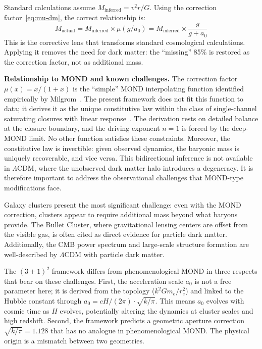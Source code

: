 \documentclass[aps,prd,preprint,superscriptaddress,showpacs,preprintnumbers,amsmath,amssymb,nofootinbib]{revtex4-2}
\begin{document}
Standard calculations assume $M_{\text{inferred}} = v^2 r / G$. Using the correction factor~\eqref{eq:mu-dm}, the correct relationship is:
\begin{equation}
M_{\text{actual}} = M_{\text{inferred}} \times \mu(g/a_0) = M_{\text{inferred}} \times \frac{g}{g + a_0}
\label{eq:corrective-lens}
\end{equation}
This is the corrective lens that transforms standard cosmological calculations. Applying it removes the need for dark matter: the ``missing'' 85\% is restored as the correction factor, not as additional mass.

\textbf{Relationship to MOND and known challenges.} The correction factor $\mu(x) = x/(1+x)$ is the ``simple'' MOND interpolating function identified empirically by Milgrom~\cite{milgrom1983}. The present framework does not fit this function to data; it derives it as the unique constitutive law within the class of single-channel saturating closures with linear response~\cite{paper1}. The derivation rests on detailed balance at the closure boundary, and the driving exponent $n = 1$ is forced by the deep-MOND limit. No other function satisfies these constraints. Moreover, the constitutive law is invertible: given observed dynamics, the baryonic mass is uniquely recoverable, and vice versa. This bidirectional inference is not available in $\Lambda$CDM, where the unobserved dark matter halo introduces a degeneracy. It is therefore important to address the observational challenges that MOND-type modifications face.

Galaxy clusters present the most significant challenge: even with the MOND correction, clusters appear to require additional mass beyond what baryons provide. The Bullet Cluster, where gravitational lensing centers are offset from the visible gas, is often cited as direct evidence for particle dark matter. Additionally, the CMB power spectrum and large-scale structure formation are well-described by $\Lambda$CDM with particle dark matter.

The $(3+1)^2$ framework differs from phenomenological MOND in three respects that bear on these challenges. First, the acceleration scale $a_0$ is not a free parameter here; it is derived from the topology ($k^2 G m_e / r_e^2$) and linked to the Hubble constant through $a_0 = cH/(2\pi) \cdot \sqrt{k/\pi}$. This means $a_0$ evolves with cosmic time as $H$ evolves, potentially altering the dynamics at cluster scales and high redshift. Second, the framework predicts a geometric aperture correction $\sqrt{k/\pi} = 1.128$ that has no analogue in phenomenological MOND. The physical origin is a mismatch between two geometries.
\end{document}
